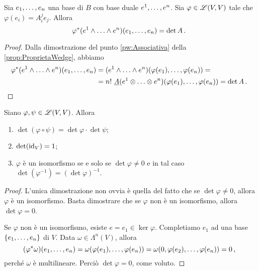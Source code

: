 \begin{proposition}
	Sia $\seqb en,$ una base di $B$ con base duale $\seqa en,$. Sia $\varphi \in \Lin(V,V)$ tale che $\varphi(e_i) = A_i^je_j$.
	Allora
	\begin{equation*}
		\varphi^*(\seqa en\wedge) (\seqb en,) = \det A \punto %
	\end{equation*}
\end{proposition}
\begin{proof}	
	Dalla dimostrazione del punto \ref{pw:Associativa} della \cref{prop:ProprietaWedge}, abbiamo
	\begin{align*}
		\varphi^*(\seqa en\wedge) (\seqb en,) &= (\seqa en\wedge)(\varphi(e_1),\ldots, \varphi(e_n)) =\\
		&=n!\ \antisimm (\seqa en\otimes)(\varphi(e_1),\ldots,\varphi(e_n)) = \det A
		\punto
	\end{align*}
\end{proof}

\begin{proposition}
	Siano $\varphi,\psi \in\Lin(V,V)$. Allora
	\begin{enumerate}
		\item $\det(\varphi\circ\psi) = \det \varphi \cdot \det \psi$;
		\item $\det (\id_V) = 1$;
		\item $\varphi$ è un isomorfismo se e solo se $\det\varphi\not=0$ e in tal caso $\det(\varphi^{-1}) = (\det \varphi)^{-1}$.
	\end{enumerate}
\end{proposition}
\begin{proof}
	L'unica dimostrazione non ovvia è quella del fatto che se $\det\varphi\not=0$, allora $\varphi$ è un isomorfismo.
	Basta dimostrare che se $\varphi$ non è un isomorfismo, allora $\det\varphi = 0$.
	
	Se $\varphi$ non è un isomorfismo, esiste $e=e_1\in\ker\varphi$. Completiamo $e_1$ ad una base $\{\seqb en,\}$ di $V$. Data $\omega\in\Lambda^n(V)$, allora
	\begin{equation*}
		(\varphi^*\omega)(\seqb en,) = \omega(\varphi(e_1),\ldots,\varphi(e_n)) = \omega(0,\varphi(e_2),\ldots,\varphi(e_n)) = 0 \virgola
	\end{equation*}
	perché $\omega$ è multilineare. Perciò $\det\varphi = 0$, come voluto.
\end{proof}

